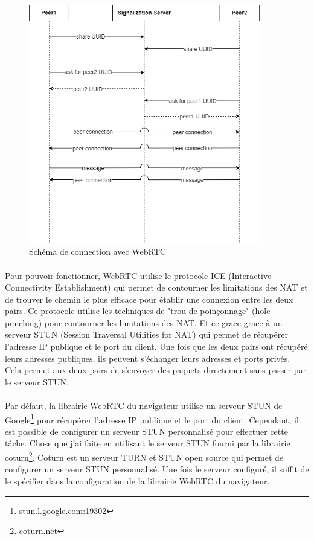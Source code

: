 \begin{figure}[h]
    \centering
    \includegraphics[width=0.9\textwidth]{assets/webrtc.png}
    \caption{Schéma de connection avec WebRTC}
    \label{fig:webrtc}
\end{figure}

\newpage

\paragraph{}
Pour pouvoir fonctionner, WebRTC utilise le protocole ICE (Interactive Connectivity Establishment) qui permet de contourner les limitations des NAT et de trouver le chemin le plus efficace pour établir une connexion entre les deux pairs. 
Ce protocole utilise les techniques de "trou de poinçonnage" (hole punching) pour contourner les limitations des NAT. Et ce grace grace à un serveur STUN (Session Traversal Utilities for NAT) qui permet de récupérer l'adresse IP publique et le port du client.
Une fois que les deux pairs ont récupéré leurs adresses publiques, ils peuvent s'échanger leurs adresses et ports privés. Cela permet aux deux pairs de s'envoyer des paquets directement sans passer par le serveur STUN. 

\paragraph{}
Par défaut, la librairie WebRTC du navigateur utilise un serveur STUN de Google\footnote{stun.l.google.com:19302} pour récupérer l'adresse IP publique et le port du client. Cependant, il est possible de configurer un serveur STUN personnalisé pour effectuer cette tâche.
Chose que j'ai faite en utilisant le serveur STUN fourni par la librairie coturn\footnote{coturn.net}. Coturn est un serveur TURN et STUN open source qui permet de configurer un serveur STUN personnalisé. Une fois le serveur configuré, il suffit de le spécifier dans 
la configuration de la librairie WebRTC du navigateur.


